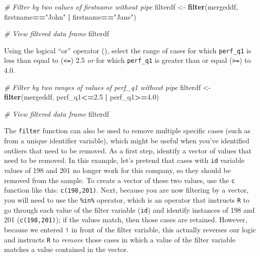 \documentclass[]{book}
\newenvironment{Shaded}{\begin{snugshade}}{\end{snugshade}}
\newcommand{\KeywordTok}[1]{\textcolor[rgb]{0.13,0.29,0.53}{\textbf{#1}}}
\newcommand{\FloatTok}[1]{\textcolor[rgb]{0.00,0.00,0.81}{#1}}
\newcommand{\StringTok}[1]{\textcolor[rgb]{0.31,0.60,0.02}{#1}}
\newcommand{\CommentTok}[1]{\textcolor[rgb]{0.56,0.35,0.01}{\textit{#1}}}
\newcommand{\OperatorTok}[1]{\textcolor[rgb]{0.81,0.36,0.00}{\textbf{#1}}}
\newcommand{\NormalTok}[1]{#1}
\begin{document}
\begin{Shaded}
\begin{Highlighting}[]
\CommentTok{# Filter by two values of firstname without pipe}
\NormalTok{filterdf <-}\StringTok{ }\KeywordTok{filter}\NormalTok{(mergeddf, firstname}\OperatorTok{==}\StringTok{"John"} \OperatorTok{|}\StringTok{ }\NormalTok{firstname}\OperatorTok{==}\StringTok{"Jane"}\NormalTok{)}

\CommentTok{# View filtered data frame}
\NormalTok{filterdf}
\end{Highlighting}
\end{Shaded}

Using the logical ``or'' operator (\texttt{\textbar{}}), select the
range of cases for which \texttt{perf\_q1} is less than equal to
(\texttt{\textless{}=}) 2.5 \emph{or} for which \texttt{perf\_q1} is
greater than or equal (\texttt{\textgreater{}=}) to 4.0.

\begin{Shaded}
\begin{Highlighting}[]
\CommentTok{# Filter by two ranges of values of perf_q1 without pipe}
\NormalTok{filterdf <-}\StringTok{ }\KeywordTok{filter}\NormalTok{(mergeddf, perf_q1}\OperatorTok{<=}\FloatTok{2.5} \OperatorTok{|}\StringTok{ }\NormalTok{perf_q1}\OperatorTok{>=}\FloatTok{4.0}\NormalTok{)}

\CommentTok{# View filtered data frame}
\NormalTok{filterdf}
\end{Highlighting}
\end{Shaded}

The \texttt{filter} function can also be used to remove multiple
specific cases (such as from a unique identifier variable), which might
be useful when you've identified outliers that need to be removed. As a
first step, identify a vector of values that need to be removed. In this
example, let's pretend that cases with \texttt{id} variable values of
198 and 201 no longer work for this company, so they should be removed
from the sample. To create a vector of these two values, use the
\texttt{c} function like this: \texttt{c(198,201)}. Next, because you
are now filtering by a vector, you will need to use the \texttt{\%in\%}
operator, which is an operator that instructs \texttt{R} to go through
each value of the filter variable (\texttt{id}) and identify instances
of 198 and 201 (\texttt{c(198,201)}); if the values match, then those
cases are retained. However, because we entered \texttt{!} in front of
the filter variable, this actually reverses our logic and instructs
\texttt{R} to \emph{remove} those cases in which a value of the filter
variable matches a value contained in the vector.
\end{document}
